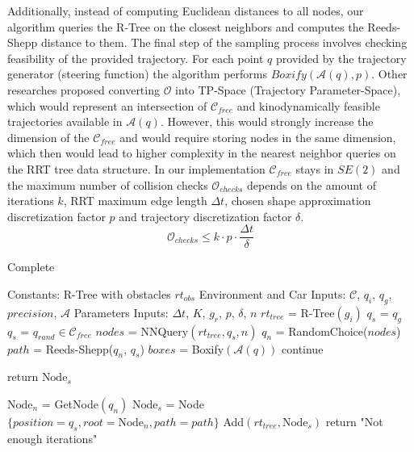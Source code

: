 \documentclass[a4paper,12pt]{article}
\DeclareRobustCommand{\[}{\begin{equation}}
\DeclareRobustCommand{\]}{\end{equation}}
\numberwithin{equation}{section}
\numberwithin{algorithm}{section}
\begin{document}
Additionally, instead of computing Euclidean distances to all nodes, our algorithm queries the R-Tree on the closest neighbors and computes the Reeds-Shepp distance to them.
The final step of the sampling process involves checking feasibility of the provided trajectory.
For each point $q$ provided by the trajectory generator (steering function) the algorithm performs $Boxify(\mathcal{A}(q), p)$.
Other researches proposed converting $\mathcal{O}$ into TP-Space (Trajectory Parameter-Space), which would represent an intersection of $\mathcal{C}_{free}$ and 
kinodynamically feasible trajectories available in $\mathcal{A}(q)$. However, this would strongly increase the dimension of the $\mathcal{C}_{free}$ and would require
storing nodes in the same dimension, which then would lead to higher complexity in the nearest neighbor queries on the RRT tree data structure.
In our implementation $\mathcal{C}_{free}$ stays in $SE(2)$ and the maximum number of collision checks $\mathcal{O}_{checks}$ depends on the amount of iterations $k$, RRT maximum edge length $\Delta{t}$, chosen shape approximation discretization factor $p$ and trajectory discretization factor $\delta$.
\[
\mathcal{O}_{checks} \leq k\cdot p\cdot \frac{\Delta{t}}{\delta}
\]

\begin{algorithm}[H]
    \caption{Complete}
    \begin{algorithmic}[1]
    \State Constants: R-Tree with obstacles $rt_{obs}$
    \State Environment and Car Inputs: $\mathcal{C}$, $q_i$, $q_g$, $precision$, $\mathcal{A}$
    \State Parameters Inputs: $\Delta{t}$, $K$, $g_r$, $p$, $\delta$, $n$
    \State $rt_{tree}$ = R-Tree$(g_i)$
            \State $q_s$ = $q_g$
        \Else
            \State $q_s$ = $q_{rand}\in\mathcal{C}_{free}$
        \EndIf
        \State $nodes$ = NNQuery$(rt_{tree}, q_s, n)$
        \State $q_n$ = RandomChoice($nodes$)
        \State $path$ = Reeds-Shepp($q_n$, $q_s$)
            $boxes$ = Boxify$(\mathcal{A}(q))$
                    \State continue
                \EndIf
            \EndFor
        \EndFor

            \State return $\text{Node}_s$
        \EndIf        

        \State $\text{Node}_n$ = GetNode$(q_n)$
        \State $\text{Node}_s$ = Node$\{position=q_s, root=\text{Node}_n, path=path\}$
        \State Add$(rt_{tree}, \text{Node}_s)$
    \EndFor
    \State return "Not enough iterations"
    \end{algorithmic}
\end{algorithm}
\end{document}
